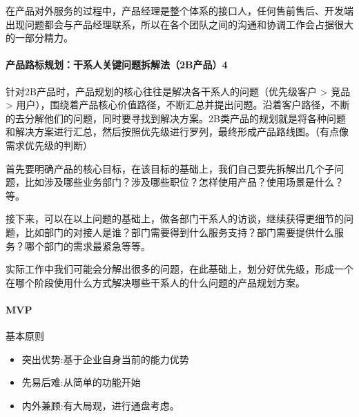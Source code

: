 \documentclass[letterpaper,10pt,english]{sphinxmanual}
\begin{document}
在产品对外服务的过程中，产品经理是整个体系的接口人，任何售前售后、开发端出现问题都会与产品经理联系，所以在各个团队之间的沟通和协调工作会占据很大的一部分精力。


\paragraph{产品路标规划：干系人关键问题拆解法（2B产品）4\sphinxfootnotemark[83]}
\label{\detokenize{chapter_introduction/2B:b-4}}%
\begin{footnotetext}[83]\sphinxAtStartFootnote
{}
%
\end{footnotetext}\ignorespaces 
针对2B产品时，产品规划的核心往往是解决各干系人的问题（优先级客户 > 竞品
>
用户），围绕着产品核心价值路径，不断汇总并提出问题。沿着客户路径，不断的去分解他们的问题，同时要寻找到解决方案。2B类产品的规划就是将各种问题和解决方案进行汇总，然后按照优先级进行罗列，最终形成产品路线图。（有点像需求优先级的判断）

首先要明确产品的核心目标，在该目标的基础上，我们自己要先拆解出几个子问题，比如涉及哪些业务部门？涉及哪些职位？怎样使用产品？使用场景是什么？等。

接下来，可以在以上问题的基础上，做各部门干系人的访谈，继续获得更细节的问题，比如部门的对接人是谁？部门需要得到什么服务支持？部门需要提供什么服务？哪个部门的需求最紧急等等。

实际工作中我们可能会分解出很多的问题，在此基础上，划分好优先级，形成一个在哪个阶段使用什么方式解决哪些干系人的什么问题的产品规划方案。


\paragraph{MVP}
\label{\detokenize{chapter_introduction/2B:mvp}}
基本原则 %
\begin{footnote}[84]\sphinxAtStartFootnote
{}
%
\end{footnote}
\begin{itemize}
\item {} 
突出优势:基于企业自身当前的能力优势

\item {} 
先易后难:从简单的功能开始

\item {} 
内外兼顾:有大局观，进行通盘考虑。

\end{itemize}
\end{document}
